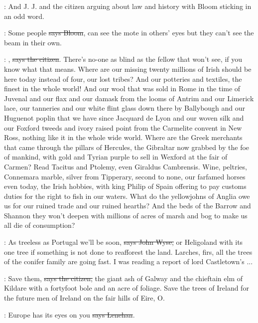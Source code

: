 \Nq:
And J. J. and the citizen arguing about law and history with Bloom
sticking in an odd word.

\Bloom:
Some people \sout{says Bloom},
can see the mote in others' eyes but they can't
see the beam in their own.

\citizen:
, \sout{says the citizen}.
There's no-one as blind as the fellow that
won't see, if you know what that means. Where are our missing
twenty millions of Irish should be here today instead of four,
our lost tribes? And our potteries and textiles, the finest in
the whole world! And our wool that was sold in Rome in the time
of Juvenal and our flax and our damask from the looms of Antrim
and our Limerick lace, our tanneries and our white flint glass
down there by Ballybough and our Huguenot poplin that we have since
Jacquard de Lyon and our woven silk and our Foxford tweeds and ivory
raised point from the Carmelite convent in New Ross, nothing like it in
the whole wide world. Where are the Greek merchants that came through the
pillars of Hercules, the Gibraltar now grabbed by the foe of mankind, with
gold and Tyrian purple to sell in Wexford at the fair of Carmen? Read
Tacitus and Ptolemy, even Giraldus Cambrensis. Wine, peltries,
Connemara marble, silver from Tipperary, second to none, our farfamed
horses even today, the Irish hobbies, with king Philip of Spain offering
to pay customs duties for the right to fish in our waters. What do the
yellowjohns of Anglia owe us for our ruined trade and our ruined hearths?
And the beds of the Barrow and Shannon they won't deepen with millions
of acres of marsh and bog to make us all die of consumption?

\johnwyse:
As treeless as Portugal we'll be soon,
\sout{says John Wyse,} or Heligoland
with its one tree if something is not done to reafforest the land.
Larches, firs, all the trees of the conifer family are going fast. I was
reading a report of lord Castletown's ...

\citizen:
Save them, \sout{says the citizen,}
the giant ash of Galway and the chieftain
elm of Kildare with a fortyfoot bole and an acre of foliage. Save the
trees of Ireland for the future men of Ireland on the fair hills of
Eire, O.

\lenehan:
Europe has its eyes on you \sout{says Lenehan}.

